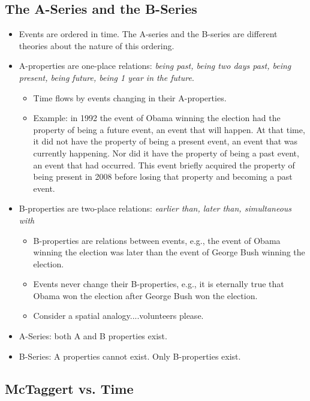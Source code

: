 \documentclass[oneside]{article}
\begin{document}
\subsection*{The A-Series and the B-Series}

\begin{itemize}
\item Events are ordered in time. The A-series and the B-series are different theories about the nature of this ordering. 
\item A-properties are one-place relations: \emph{being past, being two days past, being present, being future, being 1 year in the future}.
\begin{itemize}
\item Time flows by events changing in their A-properties. 
\item Example: in 1992 the event of Obama winning the election had the property of being a future event, an event that will happen. At that time, it did not have the property of being a present event, an event that was currently happening. Nor did it have the property of being a past event, an event that had occurred. This event briefly acquired the property of being present in 2008 before losing that property and becoming a past event. 
\end{itemize}
\item B-properties are two-place relations: \emph{earlier than, later than, simultaneous with}
\begin{itemize}
\item B-properties are relations between events, e.g., the event of Obama winning the election was later than the event of George Bush winning the election.
\item Events never change their B-properties, e.g., it is eternally true that Obama won the election after George Bush won the election.
\item Consider a spatial analogy....volunteers please.
\end{itemize}
\item A-Series: both A and B properties exist. 
\item B-Series: A properties cannot exist. Only B-properties exist. 
\end{itemize}


\subsection*{McTaggert vs. Time}
\end{document}
